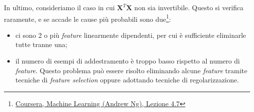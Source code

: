 In ultimo, consideriamo il caso in cui $\mathbf{X}^T\mathbf{X}$ non sia invertibile. Questo si verifica raramente, e se accade le cause più probabili sono due\footnote{\href{http://www.youtube.com/watch?v=0TMfGA3zQFQ}{Coursera, Machine Learning (Andrew Ng), Lezione 4.7}}:
\begin{itemize}
\item ci sono 2 o più \emph{feature} linearmente dipendenti, per cui è sufficiente eliminarle tutte tranne una;
\item il numero di esempi di addestramento è troppo basso rispetto al numero di \emph{feature}. Questo problema può essere risolto eliminando alcune \emph{feature} tramite tecniche di \emph{feature selection} oppure adottando tecniche di regolarizzazione.
\end{itemize}


